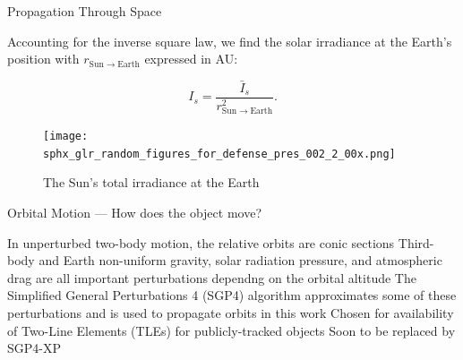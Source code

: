 \documentclass{beamer}
\begin{document}
\begin{frame}{Propagation Through Space}
    \begin{outline}
        \1 Accounting for the inverse square law, we find the solar irradiance at the Earth's position with $r_{\mathrm{Sun} \rightarrow \mathrm{Earth}}$ expressed in AU:

        \begin{equation*}
            I_s = \frac{\bar{I}_{s}}{r_{\mathrm{Sun} \rightarrow \mathrm{Earth}}^2}.
        \end{equation*}

    \end{outline}

    \begin{figure}
        \centering
        \texttt{[image: sphx\_glr\_random\_figures\_for\_defense\_pres\_002\_2\_00x.png]}
        \label{fig:sun}
        \caption{The Sun's total irradiance at the Earth}
    \end{figure}
\end{frame}

\begin{frame}{Orbital Motion --- How does the object move?}
    \begin{outline}
        \1 In unperturbed two-body motion, the relative orbits are conic sections
        \1 Third-body and Earth non-uniform gravity, solar radiation pressure, and atmospheric drag are all important perturbations dependng on the orbital altitude
        \1 The Simplified General Perturbations 4 (SGP4) algorithm approximates some of these perturbations and is used to propagate orbits in this work
        \2 Chosen for availability of Two-Line Elements (TLEs) for publicly-tracked objects 
        \2 Soon to be replaced by SGP4-XP \cite{payne2022}
    \end{outline}
\end{frame}
\end{document}
